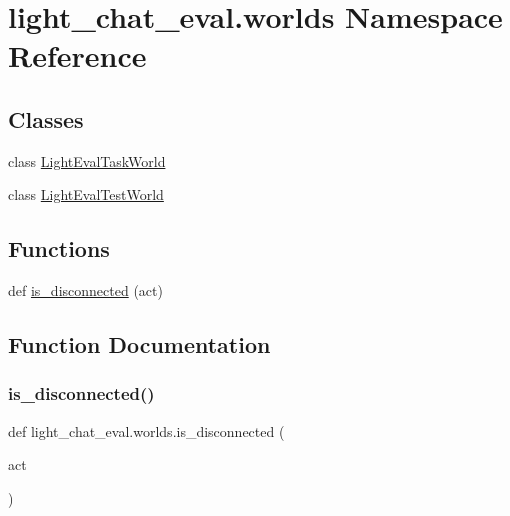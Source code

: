 \hypertarget{namespacelight__chat__eval_1_1worlds}{}\section{light\+\_\+chat\+\_\+eval.\+worlds Namespace Reference}
\label{namespacelight__chat__eval_1_1worlds}
\subsection*{Classes}
\begin{DoxyCompactItemize}
\item 
class \hyperlink{classlight__chat__eval_1_1worlds_1_1LightEvalTaskWorld}{Light\+Eval\+Task\+World}
\item 
class \hyperlink{classlight__chat__eval_1_1worlds_1_1LightEvalTestWorld}{Light\+Eval\+Test\+World}
\end{DoxyCompactItemize}
\subsection*{Functions}
\begin{DoxyCompactItemize}
\item 
def \hyperlink{namespacelight__chat__eval_1_1worlds_a0813e8622db7b552e60a63826daf8ace}{is\+\_\+disconnected} (act)
\end{DoxyCompactItemize}


\subsection{Function Documentation}
\mbox{\label{namespacelight__chat__eval_1_1worlds_a0813e8622db7b552e60a63826daf8ace}} 
\subsubsection{\texorpdfstring{is\+\_\+disconnected()}{is\_disconnected()}}
{\footnotesize\ttfamily def light\+\_\+chat\+\_\+eval.\+worlds.\+is\+\_\+disconnected (\begin{DoxyParamCaption}\item[{}]{act }\end{DoxyParamCaption})}

